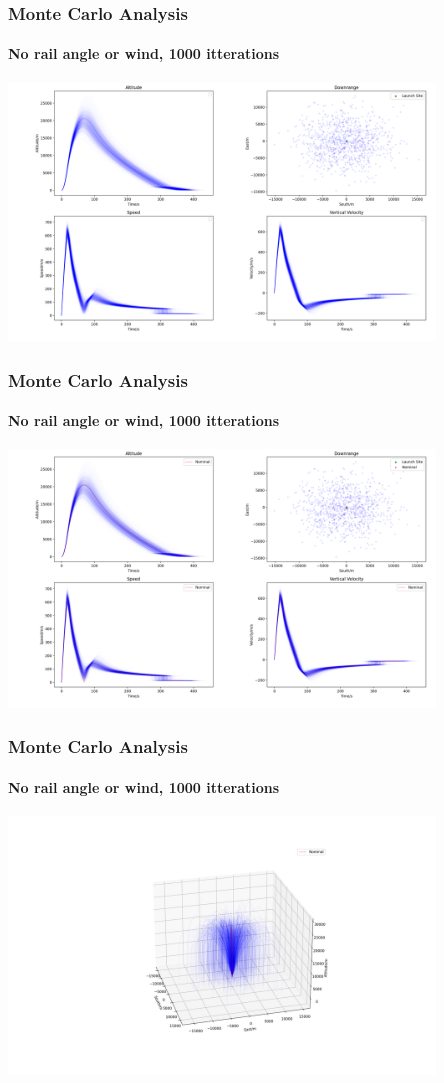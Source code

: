 \documentclass{beamer}
\begin{document}
    \begin{frame}
        \frametitle{Monte Carlo Analysis}
        \framesubtitle{No rail angle or wind, 1000 itterations}
        \includegraphics[width=0.85\textwidth]{images/stats_example1.png}
    \end{frame}
    \begin{frame}
        \frametitle{Monte Carlo Analysis}
        \framesubtitle{No rail angle or wind, 1000 itterations}
        \includegraphics[width=0.85\textwidth]{images/stats_example1_with_nom.png}
    \end{frame}
    \begin{frame}
        \frametitle{Monte Carlo Analysis}
        \framesubtitle{No rail angle or wind, 1000 itterations}
        \includegraphics[width=0.85\textwidth]{images/stats_example2_with_nom.png}
    \end{frame}
\end{document}
